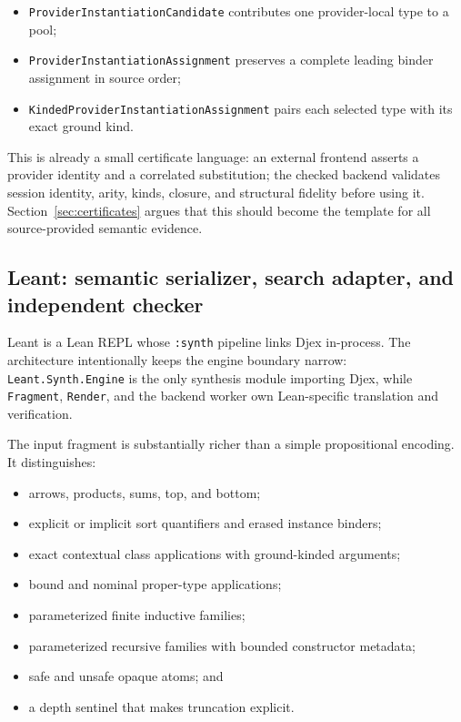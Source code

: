 \documentclass[11pt]{article}
\newcommand{\code}[1]{\texttt{#1}}
\newcommand{\Djex}{\textsf{Djex}}
\newcommand{\Leant}{\textsf{Leant}}
\begin{document}
\begin{itemize}
  \item \code{ProviderInstantiationCandidate} contributes one provider-local
    type to a pool;
  \item \code{ProviderInstantiationAssignment} preserves a complete leading
    binder assignment in source order;
  \item \code{KindedProviderInstantiationAssignment} pairs each selected type
    with its exact ground kind.
\end{itemize}

This is already a small certificate language: an external frontend asserts a
provider identity and a correlated substitution; the checked backend validates
session identity, arity, kinds, closure, and structural fidelity before using
it.  Section~\ref{sec:certificates} argues that this should become the template
for all source-provided semantic evidence.

\subsection{Leant: semantic serializer, search adapter, and independent checker}

\Leant{} is a Lean REPL whose \code{:synth} pipeline links \Djex{} in-process.
The architecture intentionally keeps the engine boundary narrow:
\code{Leant.Synth.Engine} is the only synthesis module importing \Djex{}, while
\code{Fragment}, \code{Render}, and the backend worker own Lean-specific
translation and verification.

The input fragment is substantially richer than a simple propositional
encoding.  It distinguishes:

\begin{itemize}
  \item arrows, products, sums, top, and bottom;
  \item explicit or implicit sort quantifiers and erased instance binders;
  \item exact contextual class applications with ground-kinded arguments;
  \item bound and nominal proper-type applications;
  \item parameterized finite inductive families;
  \item parameterized recursive families with bounded constructor metadata;
  \item safe and unsafe opaque atoms; and
  \item a depth sentinel that makes truncation explicit.
\end{itemize}
\end{document}
